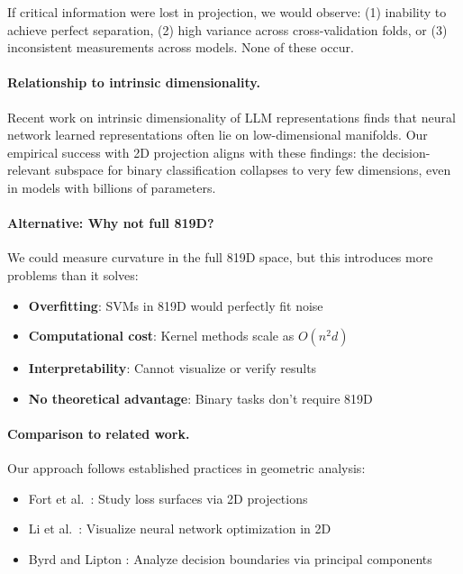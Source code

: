 \documentclass[11pt]{article}
\begin{document}
If critical information were lost in projection, we would observe: (1) inability to achieve perfect separation, (2) high variance across cross-validation folds, or (3) inconsistent measurements across models. None of these occur.

\paragraph{Relationship to intrinsic dimensionality.}
Recent work on intrinsic dimensionality of LLM representations \citep{aghajanyan2021intrinsic} finds that neural network learned representations often lie on low-dimensional manifolds. Our empirical success with 2D projection aligns with these findings: the decision-relevant subspace for binary classification collapses to very few dimensions, even in models with billions of parameters.

\paragraph{Alternative: Why not full 819D?}
We could measure curvature in the full 819D space, but this introduces more problems than it solves:
\begin{itemize}
    \item \textbf{Overfitting}: SVMs in 819D would perfectly fit noise
    \item \textbf{Computational cost}: Kernel methods scale as $O(n^2 d)$
    \item \textbf{Interpretability}: Cannot visualize or verify results
    \item \textbf{No theoretical advantage}: Binary tasks don't require 819D
\end{itemize}

\paragraph{Comparison to related work.}
Our approach follows established practices in geometric analysis:
\begin{itemize}
    \item Fort et al.\ \citep{fort2019emergent}: Study loss surfaces via 2D projections
    \item Li et al.\ \citep{li2018visualizing}: Visualize neural network optimization in 2D
    \item Byrd and Lipton \citep{byrd2019effect}: Analyze decision boundaries via principal components
\end{itemize}
\end{document}
